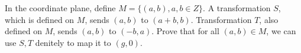 In the coordinate plane, define $M = \{(a, b),a,b \in Z\}$. A transformation $S$, which is defined on $M$, sends $(a,b)$
to $(a + b, b)$. Transformation $T$, also defined on $M$, sends $(a, b)$ to $(-b, a)$. Prove that for all $(a, b) \in M$, we
can use $S,T$ denitely to map it to $(g,0)$.